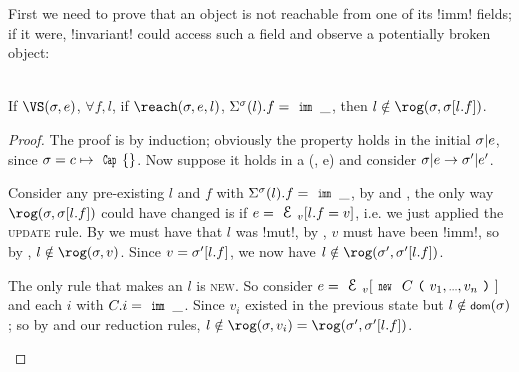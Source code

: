 First we need to prove that an object is not reachable from one of its \Q!imm! fields; if it were, \Q!invariant! could access such a field and observe a potentially broken object:\SS
\begin{Lemma}\rm\ \\
\indent If $\VS(\s, e)$, $\forall f,l$, if $\reach(\s, e, l)$, $\Ss(l).f = \Kw{imm}\,\_$, then $l \notin \rog(\s, \s[l.f])$.
\end{Lemma}\SS
\begin{proof}
The proof is by induction; obviously the property holds in the initial $\sigma|e$, since $\s = c\mapsto \Kw{Cap}\{\}$. Now suppose it holds in a \VS(\s, e) and consider $\sigma|e \rightarrow \sigma'|e'$.
\begin{ienumerate}
	\item Consider any pre-existing \reach $l$ and $f$ with $\Ss(l).f = \Kw{imm}\,\_$, by  and , the only way $\rog(\s, \s[l.f])$ could have changed is if $e = \EV[l.f = v]$, i.e. we just applied the \textsc{update} rule. By  we must have that $l$ was \Q!mut!, by , $v$ must have been \Q!imm!, so by , $l \notin \rog(\s, v)$. Since $v = \sigma'[l.f]$, we now have $l \notin \rog(\s', \s'[l.f])$.
	\item The only rule that makes an $l$ \reach is \textsc{new}. So consider $e =\EV[\Kw{new}\ C\oR v_1,\ldots,v_n\cR]$ and each $i$ with $C.i = \Kw{imm}\,\_$. Since $v_i$ existed in the previous state but $l \notin \dom(\s)$; so by \VS and our reduction rules, $l \notin \rog(\s, v_i) = \rog(\s', \s'[l.f])$.
\end{ienumerate}
\end{proof}


